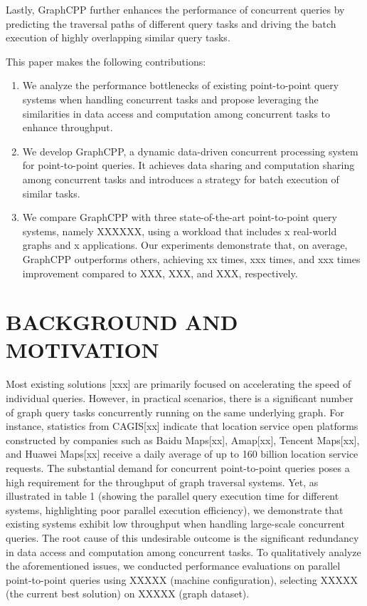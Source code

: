 \documentclass[lettersize,journal]{IEEEtran} %
\begin{document}
Lastly, GraphCPP further enhances the performance of concurrent queries by predicting the traversal paths of different query tasks and driving the batch execution of highly overlapping similar query tasks.

This paper makes the following contributions:
\begin{enumerate}
  \item{We analyze the performance bottlenecks of existing point-to-point query systems when handling concurrent tasks and propose leveraging the similarities in data access and computation among concurrent tasks to enhance throughput.}
  \item{We develop GraphCPP, a dynamic data-driven concurrent processing system for point-to-point queries. It achieves data sharing and computation sharing among concurrent tasks and introduces a strategy for batch execution of similar tasks.}
  \item{We compare GraphCPP with three state-of-the-art point-to-point query systems, namely XXXXXX, using a workload that includes x real-world graphs and x applications. Our experiments demonstrate that, on average, GraphCPP outperforms others, achieving xx times, xxx times, and xxx times improvement compared to XXX, XXX, and XXX, respectively.}
\end{enumerate}

\section{BACKGROUND AND MOTIVATION}
Most existing solutions [xxx] are primarily focused on accelerating the speed of individual queries. However, in practical scenarios, there is a significant number of graph query tasks concurrently running on the same underlying graph. For instance, statistics from CAGIS[xx] indicate that location service open platforms constructed by companies such as Baidu Maps[xx], Amap[xx], Tencent Maps[xx], and Huawei Maps[xx] receive a daily average of up to 160 billion location service requests. The substantial demand for concurrent point-to-point queries poses a high requirement for the throughput of graph traversal systems. Yet, as illustrated in table 1 (showing the parallel query execution time for different systems, highlighting poor parallel execution efficiency), we demonstrate that existing systems exhibit low throughput when handling large-scale concurrent queries. The root cause of this undesirable outcome is the significant redundancy in data access and computation among concurrent tasks. To qualitatively analyze the aforementioned issues, we conducted performance evaluations on parallel point-to-point queries using XXXXX (machine configuration), selecting XXXXX (the current best solution) on XXXXX (graph dataset).
\end{document}
